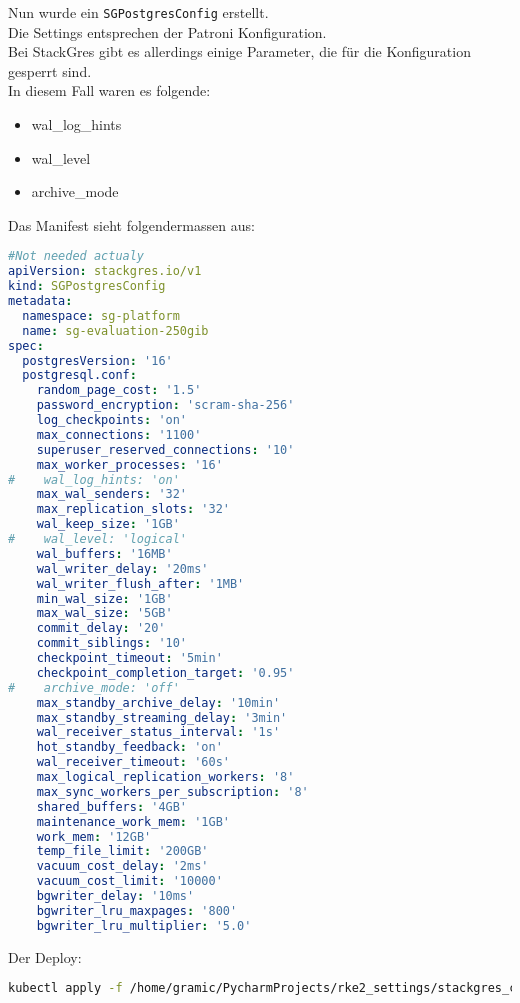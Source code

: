 Nun wurde ein \texttt{SGPostgresConfig} erstellt.\\
Die Settings entsprechen der Patroni Konfiguration.\\
Bei StackGres gibt es allerdings einige Parameter, die für die Konfiguration gesperrt sind.\\
In diesem Fall waren es folgende:
\begin{itemize}
  \item wal\_log\_hints
  \item wal\_level
  \item archive\_mode
\end{itemize}

Das Manifest sieht folgendermassen aus:
\lstset{style=gra_codestyle}
\begin{lstlisting}[language=yaml, caption=StackGres-Citus - Benchmarking - SGPostgresConfig,captionpos=b,label={lst:SGPostgresConfig.yaml},breaklines=true]
#Not needed actualy
apiVersion: stackgres.io/v1
kind: SGPostgresConfig
metadata:
  namespace: sg-platform
  name: sg-evaluation-250gib
spec:
  postgresVersion: '16'
  postgresql.conf:
    random_page_cost: '1.5'
    password_encryption: 'scram-sha-256'
    log_checkpoints: 'on'
    max_connections: '1100'
    superuser_reserved_connections: '10'
    max_worker_processes: '16'
#    wal_log_hints: 'on'
    max_wal_senders: '32'
    max_replication_slots: '32'
    wal_keep_size: '1GB'
#    wal_level: 'logical'
    wal_buffers: '16MB'
    wal_writer_delay: '20ms'
    wal_writer_flush_after: '1MB'
    min_wal_size: '1GB'
    max_wal_size: '5GB'
    commit_delay: '20'
    commit_siblings: '10'
    checkpoint_timeout: '5min'
    checkpoint_completion_target: '0.95'
#    archive_mode: 'off'
    max_standby_archive_delay: '10min'
    max_standby_streaming_delay: '3min'
    wal_receiver_status_interval: '1s'
    hot_standby_feedback: 'on'
    wal_receiver_timeout: '60s'
    max_logical_replication_workers: '8'
    max_sync_workers_per_subscription: '8'
    shared_buffers: '4GB'
    maintenance_work_mem: '1GB'
    work_mem: '12GB'
    temp_file_limit: '200GB'
    vacuum_cost_delay: '2ms'
    vacuum_cost_limit: '10000'
    bgwriter_delay: '10ms'
    bgwriter_lru_maxpages: '800'
    bgwriter_lru_multiplier: '5.0'
\end{lstlisting}

Der Deploy:
\lstset{style=gra_codestyle}
\begin{lstlisting}[language=bash, caption=StackGres-Citus - Benchmark - Deploy SGPostgresConfig,captionpos=b,label={lst:stackgres_citus-benchmnarking-deploy-SGPostgresConfig},breaklines=true]
kubectl apply -f /home/gramic/PycharmProjects/rke2_settings/stackgres_citus/stackgres_citus/SGPostgresConfig.yaml
\end{lstlisting}

